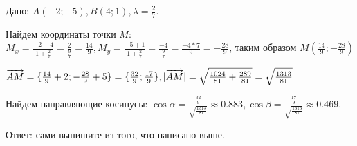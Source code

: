 \documentclass{article}
\def\vec{\ensuremath\overrightarrow}
\begin{document}
\begin{flushleft}

Дано: $A(-2; -5), B(4; 1), \lambda = \frac{2}{7}$.

Найдем координаты точки $M$: $M_x = \frac{-2 + 4}{1 + \frac{2}{7}} = \frac{2}{\frac{9}{7}} = \frac{14}{9}, M_y = \frac{-5 + 1}{1 + \frac{2}{7}} = \frac{-4}{\frac{9}{7}} = \frac{-4 * 7}{9} = -\frac{28}{9}$, таким образом $M(\frac{14}{9}; -\frac{28}{9})$

$\vec{AM} = \{\frac{14}{9} + 2; -\frac{28}{9} + 5\} = \{\frac{32}{9}; \frac{17}{9}\}, |\vec{AM}| = \sqrt{\frac{1024}{81} + \frac{289}{81}} = \sqrt{\frac{1313}{81}}$ 

Найдем направляющие косинусы: $\cos \alpha = \frac{\frac{32}{9}}{\sqrt{\frac{1313}{81}}} \approx 0.883, \cos \beta = \frac{\frac{17}{9}}{\sqrt{\frac{1313}{81}}} \approx 0.469$.

Ответ: сами выпишите из того, что написано выше.

\end{flushleft}
\end{document}
